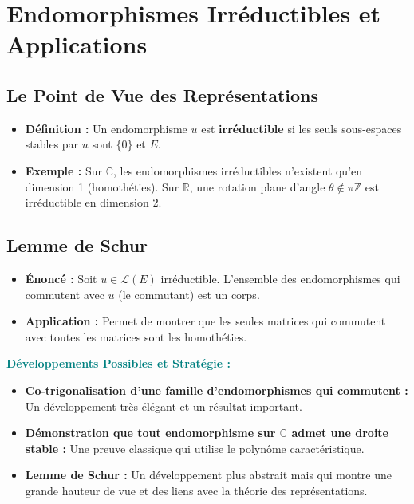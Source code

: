 \documentclass[12pt, a4paper, parskip=full]{report}
\theoremstyle{agregstyle}
\newenvironment{developpements}
  {\par\medskip\noindent\begin{oframed}\noindent\textbf{\textcolor{teal}{Développements Possibles et Stratégie :}}}
  {\end{oframed}\par\medskip}
\begin{document}
\section{Endomorphismes Irréductibles et Applications}

\subsection{Le Point de Vue des Représentations}
\begin{itemize}
    \item \textbf{Définition :} Un endomorphisme $u$ est \textbf{irréductible} si les seuls sous-espaces stables par $u$ sont $\{0\}$ et $E$.
    \item \textbf{Exemple :} Sur $\mathbb{C}$, les endomorphismes irréductibles n'existent qu'en dimension 1 (homothéties). Sur $\mathbb{R}$, une rotation plane d'angle $\theta \notin \pi\mathbb{Z}$ est irréductible en dimension 2.
\end{itemize}

\subsection{Lemme de Schur}
\begin{itemize}
    \item \textbf{Énoncé :} Soit $u \in \mathcal{L}(E)$ irréductible. L'ensemble des endomorphismes qui commutent avec $u$ (le commutant) est un corps.
    \item \textbf{Application :} Permet de montrer que les seules matrices qui commutent avec toutes les matrices sont les homothéties.
\end{itemize}

\begin{developpements}
    \begin{itemize}
        \item \textbf{Co-trigonalisation d'une famille d'endomorphismes qui commutent :} Un développement très élégant et un résultat important.
        \item \textbf{Démonstration que tout endomorphisme sur $\mathbb{C}$ admet une droite stable :} Une preuve classique qui utilise le polynôme caractéristique.
        \item \textbf{Lemme de Schur :} Un développement plus abstrait mais qui montre une grande hauteur de vue et des liens avec la théorie des représentations.
    \end{itemize}
\end{developpements}
\end{document}
